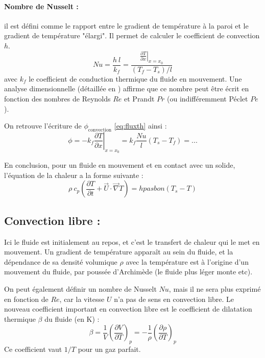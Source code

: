 \paragraph{Nombre de Nusselt :}il est défini comme le rapport entre le gradient de température à la paroi et le gradient de température "élargi". Il permet de calculer le coefficient de convection $h$.
%
\begin{equation}
Nu = \frac{h~l}{k_f}
= \frac{\left. \frac{\partial{T}}{\partial{x}} \right|_{x=x_0}}
{ \left( T_f - T_s \right)/l}
\end{equation}
%
avec $k_f$ le coefficient de conduction thermique du fluide en mouvement. Une analyse dimensionnelle (détaillée en \cite{battaglia2010introduction}) affirme que ce nombre peut être écrit en fonction des nombres de Reynolds $Re$ et Prandt $Pr$ (ou indifféremment Péclet $Pe$).

On retrouve l'écriture de $\phi_{\text{convection}}$ \eqref{eq:fluxth} ainsi :
%
\begin{equation}
\phi = - k_f \left. \frac{\partial{T}}{\partial{x}} \right|_{x=x_0}
     = k_f \frac{Nu}{l} \left( T_s - T_f \right)
     = ...
\end{equation}

En conclusion, pour un fluide en mouvement et en contact avec un solide, l'équation de la chaleur a la forme suivante :
%
\begin{equation}
\rho~c_p \left( \frac{\partial T}{\partial t}
+ \vec{U} \cdot \vec{\nabla} T \right)
= h pasbon \left( T_s - T \right)
\end{equation}


\subsection{Convection libre :}
Ici le fluide est initialement au repos, et c'est le transfert de chaleur qui le met en mouvement. Un gradient de température apparaît au sein du fluide, et la dépendance de sa densité volumique $\rho$ avec la température est à l'origine d'un mouvement du fluide, par poussée d'Archimède (le fluide plus léger monte etc).

On peut également définir un nombre de Nusselt $Nu$, mais il ne sera plus exprimé en fonction de $Re$, car la vitesse $U$ n'a pas de sens en convection libre. Le nouveau coefficient important en convection libre est le coefficient de dilatation thermique $\beta$ du fluide (en K) :
%
\begin{equation}
\beta = \frac{1}{V} \left( \frac{\partial V}{\partial T} \right)_p
      = - \frac{1}{\rho} \left( \frac{\partial \rho}{\partial T} \right)_p
\end{equation}
%
Ce coefficient vaut $1/T$ pour un gaz parfait.

